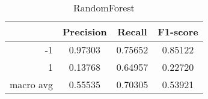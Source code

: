 \begin{table}[!h]
    \centering
    \renewcommand{\arraystretch}{1.5}
    \begin{tabular}{|r|c|c|c|}
        \hline
                  & Precision & Recall & F1-score \\ \hline
        -1        &     0.97303     &     0.75652   &    0.85122      \\ \hline
        1         &     0.13768      &     0.64957   &   0.22720       \\ \hline
        macro avg &      0.55535     &     0.70305   &    0.53921      \\ \hline
    \end{tabular}
    \caption{RandomForest}
\end{table}
